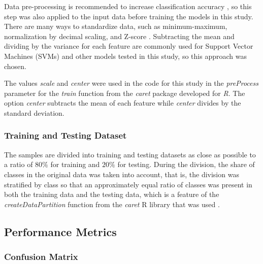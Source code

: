 \documentclass[sn-mathphys-num]{sn-jnl}%
\begin{document}
Data pre-processing is recommended to increase classification accuracy \cite{Fan2008}, so this step was also applied to the input data before training the models in this study. There are many ways to standardize data, such as minimum-maximum, normalization by decimal scaling, and Z-score \cite{Mohamad2013}. Subtracting the mean and dividing by the variance for each feature are commonly used for Support Vector Machines (SVMs) \cite{Fennell2019} and other models tested in this study, so this approach was chosen. 

The values \textit{scale} and \textit{center} were used in the code for this study in the \textit{preProcess} parameter for the \textit{train} function from the \textit{caret} package developed for \textit{R}. The option \textit{center} subtracts the mean of each feature while \textit{center} divides by the standard deviation. 

\subsubsection{Training and Testing Dataset}

The samples are divided into training and testing datasets as close as possible to a ratio of $80\%$ for training and $20\%$ for testing. During the division, the share of classes in the original data was taken into account, that is, the division was stratified by class so that an approximately equal ratio of classes was present in both the training data and the testing data, which is a feature of the \textit{createDataPartition} function from the \textit{caret} R library that was used \cite{KuhnDataSplitting2024, hyndman2018forecasting, createDataPartition2024}.

\subsection{Performance Metrics}

\subsubsection{Confusion Matrix}
\end{document}
